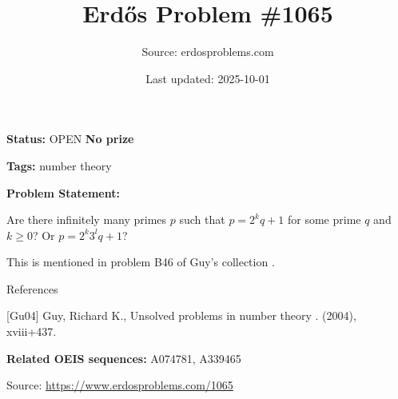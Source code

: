 \documentclass{article}
\title{Erd\H{o}s Problem \#1065}
\date{Last updated: 2025-10-01}
\author{Source: erdosproblems.com}
\begin{document}
\maketitle

\noindent\textbf{Status:} OPEN \quad \textbf{No prize}

\noindent\textbf{Tags:} number theory

\medskip

\noindent\textbf{Problem Statement:}

Are there infinitely many primes $p$ such that $p=2^kq+1$ for some prime $q$ and $k\geq 0$? Or $p=2^k3^lq+1$?




This is mentioned in problem B46 of Guy's collection \cite{Gu04}.




References

[Gu04] Guy, Richard K., Unsolved problems in number theory . (2004), xviii+437.

\noindent\textbf{Related OEIS sequences:} A074781, A339465


\bigskip
\noindent\small{Source: \url{https://www.erdosproblems.com/1065}}
\end{document}
